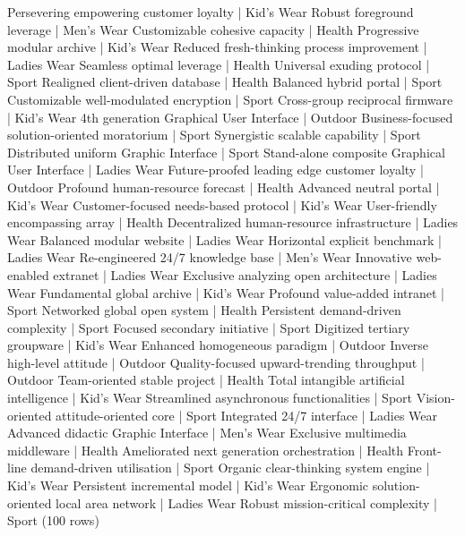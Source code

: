 \begin{pseudo*}
 Persevering empowering customer loyalty          | Kid's Wear
 Robust foreground leverage                       | Men's Wear
 Customizable cohesive capacity                   | Health
 Progressive modular archive                      | Kid's Wear
 Reduced fresh-thinking process improvement       | Ladies Wear
 Seamless optimal leverage                        | Health
 Universal exuding protocol                       | Sport
 Realigned client-driven database                 | Health
 Balanced hybrid portal                           | Sport
 Customizable well-modulated encryption           | Sport
 Cross-group reciprocal firmware                  | Kid's Wear
 4th generation Graphical User Interface          | Outdoor
 Business-focused solution-oriented moratorium    | Sport
 Synergistic scalable capability                  | Sport
 Distributed uniform Graphic Interface            | Sport
 Stand-alone composite Graphical User Interface   | Ladies Wear
 Future-proofed leading edge customer loyalty     | Outdoor
 Profound human-resource forecast                 | Health
 Advanced neutral portal                          | Kid's Wear
 Customer-focused needs-based protocol            | Kid's Wear
 User-friendly encompassing array                 | Health
 Decentralized human-resource infrastructure      | Ladies Wear
 Balanced modular website                         | Ladies Wear
 Horizontal explicit benchmark                    | Ladies Wear
 Re-engineered 24/7 knowledge base                | Men's Wear
 Innovative web-enabled extranet                  | Ladies Wear
 Exclusive analyzing open architecture            | Ladies Wear
 Fundamental global archive                       | Kid's Wear
 Profound value-added intranet                    | Sport
 Networked global open system                     | Health
 Persistent demand-driven complexity              | Sport
 Focused secondary initiative                     | Sport
 Digitized tertiary groupware                     | Kid's Wear
 Enhanced homogeneous paradigm                    | Outdoor
 Inverse high-level attitude                      | Outdoor
 Quality-focused upward-trending throughput       | Outdoor
 Team-oriented stable project                     | Health
 Total intangible artificial intelligence         | Kid's Wear
 Streamlined asynchronous functionalities         | Sport
 Vision-oriented attitude-oriented core           | Sport
 Integrated 24/7 interface                        | Ladies Wear
 Advanced didactic Graphic Interface              | Men's Wear
 Exclusive multimedia middleware                  | Health
 Ameliorated next generation orchestration        | Health
 Front-line demand-driven utilisation             | Sport
 Organic clear-thinking system engine             | Kid's Wear
 Persistent incremental model                     | Kid's Wear
 Ergonomic solution-oriented local area network   | Ladies Wear
 Robust mission-critical complexity               | Sport
(100 rows)
\end{pseudo*}

